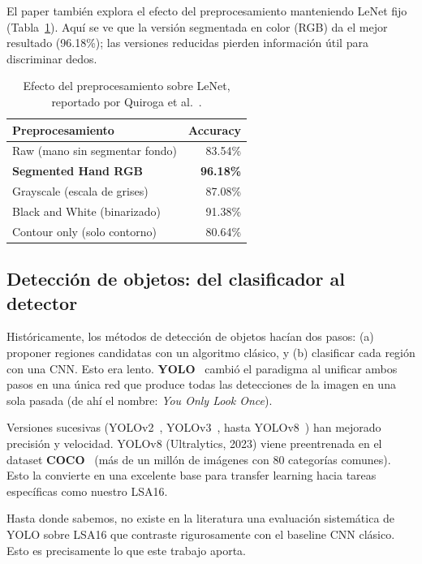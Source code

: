 \documentclass[a4paper,11pt]{article}
\begin{document}
El paper también explora el efecto del preprocesamiento manteniendo LeNet fijo (Tabla~\ref{tab:paper-preproc}). Aquí se ve que la versión segmentada en color (RGB) da el mejor resultado (96.18\%); las versiones reducidas pierden información útil para discriminar dedos.

\begin{table}[h]
\centering
\caption{Efecto del preprocesamiento sobre LeNet, reportado por Quiroga et al.~\cite{quiroga2017study}.}
\label{tab:paper-preproc}
\begin{tabular}{lr}
\toprule
\textbf{Preprocesamiento} & \textbf{Accuracy} \\
\midrule
Raw (mano sin segmentar fondo) & 83.54\% \\
\textbf{Segmented Hand RGB} & \textbf{96.18\%} \\
Grayscale (escala de grises) & 87.08\% \\
Black and White (binarizado) & 91.38\% \\
Contour only (solo contorno) & 80.64\% \\
\bottomrule
\end{tabular}
\end{table}

\subsection{Detección de objetos: del clasificador al detector}

Históricamente, los métodos de detección de objetos hacían dos pasos: (a) proponer regiones candidatas con un algoritmo clásico, y (b) clasificar cada región con una CNN. Esto era lento. \textbf{YOLO}~\cite{redmon2016yolo} cambió el paradigma al unificar ambos pasos en una única red que produce todas las detecciones de la imagen en una sola pasada (de ahí el nombre: \textit{You Only Look Once}).

Versiones sucesivas (YOLOv2~\cite{redmon2017yolov2}, YOLOv3~\cite{redmon2018yolov3}, hasta YOLOv8~\cite{jocher2023ultralytics}) han mejorado precisión y velocidad. YOLOv8 (Ultralytics, 2023) viene preentrenada en el dataset \textbf{COCO}~\cite{lin2014coco} (más de un millón de imágenes con 80 categorías comunes). Esto la convierte en una excelente base para transfer learning hacia tareas específicas como nuestro LSA16.

Hasta donde sabemos, no existe en la literatura una evaluación sistemática de YOLO sobre LSA16 que contraste rigurosamente con el baseline CNN clásico. Esto es precisamente lo que este trabajo aporta.
\end{document}
